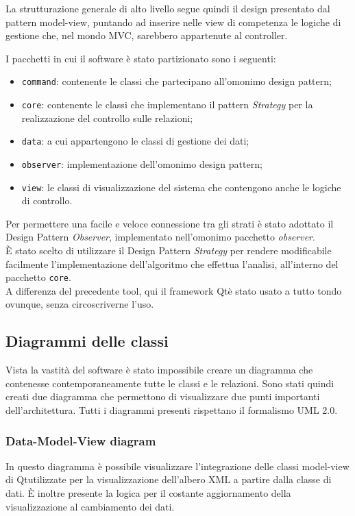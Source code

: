 	La strutturazione generale di alto livello segue quindi il design presentato dal pattern model-view, puntando ad inserire nelle view di competenza le logiche di gestione che, nel mondo MVC, sarebbero appartenute al controller.
	
	I pacchetti in cui il software è stato partizionato sono i seguenti: 
	\begin{itemize}
		\item \texttt{command}: contenente le classi che partecipano all'omonimo design pattern;
		\item\texttt{core}: contenente le classi che implementano il pattern \textit{Strategy} per la realizzazione del controllo sulle relazioni;
		\item\texttt{data}: a cui appartengono le classi di gestione dei dati;
		\item\texttt{observer}: implementazione dell'omonimo design pattern;
		\item\texttt{view}: le classi di visualizzazione del sistema che contengono anche le logiche di controllo.
	\end{itemize}
	
	Per permettere una facile e veloce connessione tra gli strati è stato adottato il Design Pattern \textit{Observer}, implementato nell'omonimo pacchetto \textit{observer}.\\
	
	È stato scelto di utilizzare il Design Pattern \textit{Strategy} per rendere modificabile facilmente l'implementazione dell'algoritmo che effettua l'analisi, all'interno del pacchetto \texttt{core}.\\
	
	A differenza del precedente tool, qui il framework Qt\textregistered è stato usato a tutto tondo ovunque, senza circoscriverne l'uso.

	\subsection{Diagrammi delle classi}
		Vista la vastità del software è stato impossibile creare un diagramma che contenesse contemporaneamente tutte le classi e le relazioni. Sono stati quindi creati due diagramma che permettono di visualizzare due punti importanti dell'architettura. Tutti i diagrammi presenti rispettano il formalismo UML 2.0.
		
		\subsubsection{Data-Model-View diagram}
			In questo diagramma è possibile visualizzare l'integrazione delle classi model-view di Qt\textregistered utilizzate per la visualizzazione dell'albero XML a partire dalla classe di dati. È inoltre presente la logica per il costante aggiornamento della visualizzazione al cambiamento dei dati.
		

